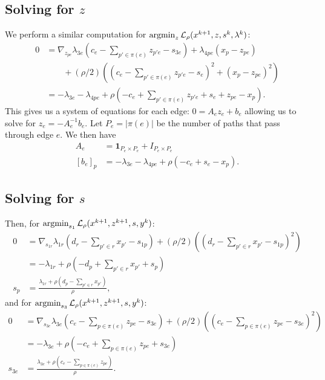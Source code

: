 \documentclass[11pt]{article}
\begin{document}
\subsection{Solving for $z$}
We perform a similar computation for $\operatorname*{argmin}_{z} \mathcal{L}_\rho(x^{k+1},z,s^k,\lambda^k)$:
\begin{align*}
0
&= \nabla_{z_{pe}}\lambda_{3e}(c_e - \sum_{p'\in\pi(e)} z_{p'e} - s_{3e})
    + \lambda_{4pe}(x_p - z_{pe})\\
& \qquad + (\rho/2)((c_e - \sum_{p'\in\pi(e)} z_{p'e} - s_e)^2 + (x_p - z_{pe})^2)\\
&= -\lambda_{3e} - \lambda_{4pe}
    + \rho(-c_e + \sum_{p'\in\pi(e)} z_{p'e} + s_e  + z_{pe} - x_p).
\end{align*}
This gives us a system of equations for each edge: $0 = A_ez_e + b_e$
allowing us to solve for $z_e = -A_e^{-1}b_e$.
Let $P_e= |\pi(e)|$ be the number of paths that pass through edge $e$.
We then have
\begin{align*}
A_e &= \mathbf{1}_{P_e\times P_e} + I_{P_e\times P_e}\\
[b_e]_p &= -\lambda_{3e} - \lambda_{4pe}
    + \rho(-c_e + s_e - x_p).
\end{align*}

\subsection{Solving for $s$}
Then, for $\operatorname*{argmin}_{s_1} \mathcal{L}_\rho(x^{k+1},z^{k+1},s,y^k)$:
\begin{align*}
0
&= \nabla_{s_{1r}}\lambda_{1r}(d_r - \sum_{p'\in r}x_{p'} - s_{1p})
    + (\rho/2)((d_r - \sum_{p'\in r}x_{p'} - s_{1p})^2)\\
&= -\lambda_{1r} + \rho(-d_p + \sum_{p'\in r}x_{p'} + s_p)\\
s_{p} &= \frac{\lambda_{1r} + \rho(d_p - \sum_{p'\in r}x_{p'})}{\rho},
\end{align*}
and for $\operatorname*{argmin}_{s_3} \mathcal{L}_\rho(x^{k+1},z^{k+1},s,y^k)$:
\begin{align*}
0
&= \nabla_{s_{3e}} \lambda_{3e}(c_e - \sum_{p\in\pi(e)} z_{pe} - s_{3e})
    + (\rho/2)((c_e - \sum_{p\in\pi(e)} z_{pe} - s_{3e})^2)\\
&= -\lambda_{3e} + \rho(-c_e + \sum_{p\in\pi(e)} z_{pe} + s_{3e})\\
s_{3e} &= \frac{\lambda_{3e} + \rho(c_e - \sum_{p\in\pi(e)}z_{pe})}{\rho}.
\end{align*}
\end{document}
